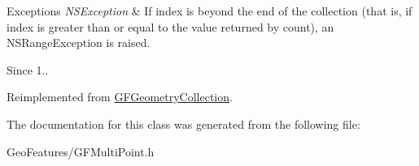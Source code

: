 \begin{DoxyExceptions}{Exceptions}
{\em N\+S\+Exception} & If index is beyond the end of the collection (that is, if index is greater than or equal to the value returned by count), an N\+S\+Range\+Exception is raised.\\
\hline
\end{DoxyExceptions}
\begin{DoxySince}{Since}
1.. 
\end{DoxySince}


Reimplemented from \hyperlink{interface_g_f_geometry_collection_ac67dd4526580a8a38408e39c489a7503}{G\+F\+Geometry\+Collection}.



The documentation for this class was generated from the following file\+:\begin{DoxyCompactItemize}
\item 
Geo\+Features/G\+F\+Multi\+Point.\+h\end{DoxyCompactItemize}
